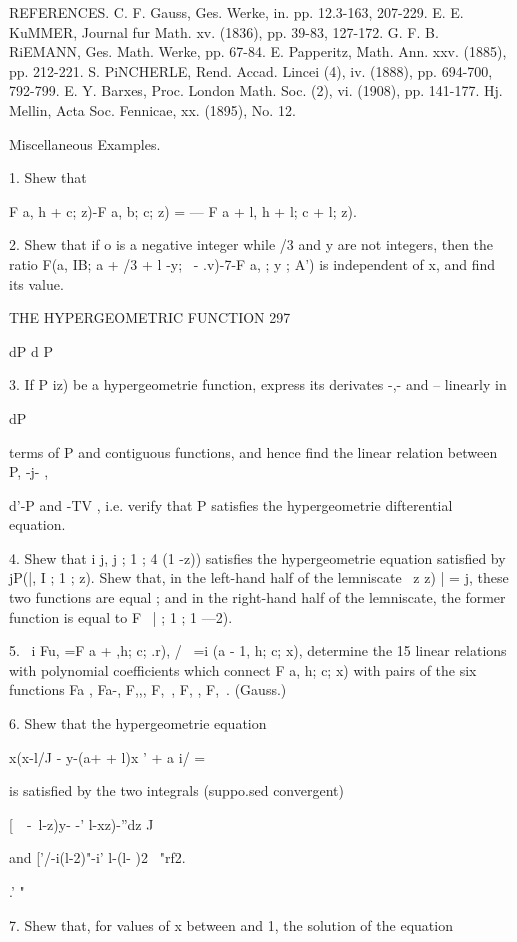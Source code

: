 REFERENCES. C. F. Gauss, Ges. Werke, in. pp. 12.3-163, 207-229. E. E.
KuMMER, Journal fur Math. xv. (1836), pp. 39-83, 127-172. G. F. B.
RiEMANN, Ges. Math. Werke, pp. 67-84. E. Papperitz, Math. Ann. xxv.
(1885), pp. 212-221. S. PiNCHERLE, Rend. Accad. Lincei (4), iv.
(1888), pp. 694-700, 792-799. E. Y. Barxes, Proc. London Math. Soc.
(2), vi. (1908), pp. 141-177. Hj. Mellin, Acta Soc. Fennicae, xx.
(1895), No. 12.

Miscellaneous Examples.

1. Shew that

F a, h + \; c; z)-F a, b; c; z) = — F a + l, h + l; c + l; z).

2. Shew that if o is a negative integer while /3 and y are not
integers, then the ratio F(a, IB; a + /3 + l -y; \ - .v)-7-F a, ; y ;
A') is independent of x, and find its value.

THE HYPERGEOMETRIC FUNCTION 297

dP d P

3. If P iz) be a hypergeometrie function, express its derivates -,-
and -- linearly in

dP

terms of P and contiguous functions, and hence find the linear
relation between P, -j- ,

d'-P and -TV , i.e. verify that P satisfies the hypergeometrie
difterential equation.

4. Shew that i j, j ; 1 ; 4 (1 -z)) satisfies the hypergeometrie
equation satisfied by jP(|, I ; 1 ; z). Shew that, in the left-hand
half of the lemniscate \ z z) | = j, these two functions are equal ;
and in the right-hand half of the lemniscate, the former function is
equal to F \, | ; 1 ; 1 —2).

5. \ i Fu, =F a + ,h; c; .r), / \ =i (a - 1, h; c; x), determine the
15 linear relations with polynomial coefficients which connect F a, h;
c; x) with pairs of the six functions Fa , Fa-, F,,, F,\ , F, , F,\ .
(Gauss.)

6. Shew that the hypergeometrie equation

x(x-l/J - y-(a+ + l)x ' + a i/ =

is satisfied by the two integrals (suppo.sed convergent)

[\ \ -\ l-z)y- -' l-xz)-''dz J

and ['/-i(l-2)"-i' l-(l- )2 ~"rf2.

.' "

7. Shew that, for values of x between and 1, the solution of the
equation

